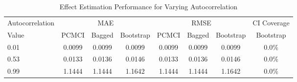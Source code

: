\begin{table}[htbp]
\centering
\caption{Effect Estimation Performance for Varying Autocorrelation}
\label{tab:auto_performance}
\begin{tabular}{l|ccc|ccc|c}
\hline
Autocorrelation & \multicolumn{3}{c|}{MAE} & \multicolumn{3}{c|}{RMSE} & CI Coverage \\
 Value & PCMCI & Bagged & Bootstrap & PCMCI & Bagged & Bootstrap & Bootstrap \\
\hline
0.01 & 0.0099 & 0.0099 & 0.0099 & 0.0099 & 0.0099 & 0.0099 & 0.0\% \\
0.53 & 0.0133 & 0.0136 & 0.0146 & 0.0133 & 0.0136 & 0.0146 & 0.0\% \\
0.99 & 1.1444 & 1.1444 & 1.1642 & 1.1444 & 1.1444 & 1.1642 & 0.0\% \\
\hline
\end{tabular}
\end{table}
